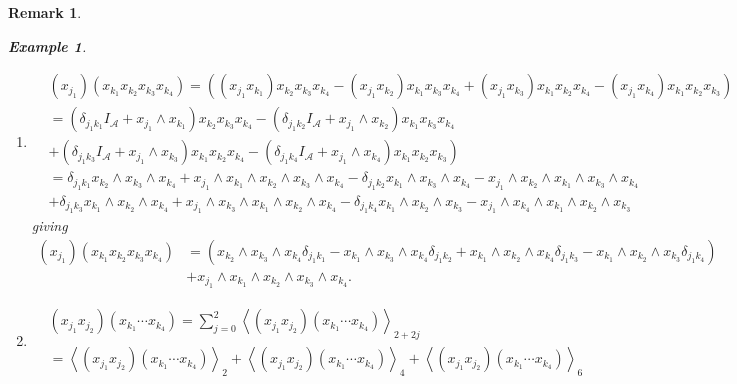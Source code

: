 \documentclass[aps,preprint]{revtex4}%
\newtheorem{example}[theorem]{Example}
\newtheorem{remark}[theorem]{Remark}
\begin{document}
\begin{remark}
\begin{example}
\begin{enumerate}
\item
\begin{align}
&  \left(  x_{j_{1}}\right)  \left(  x_{k_{1}}x_{k_{2}}x_{k_{3}}x_{k_{4}%
}\right)  =\left(  \left(  x_{j_{1}}x_{k_{1}}\right)  x_{k_{2}}x_{k_{3}%
}x_{k_{4}}-\left(  x_{j_{1}}x_{k_{2}}\right)  x_{k_{1}}x_{k_{3}}x_{k_{4}%
}+\left(  x_{j_{1}}x_{k_{3}}\right)  x_{k_{1}}x_{k_{2}}x_{k_{4}}-\left(
x_{j_{1}}x_{k_{4}}\right)  x_{k_{1}}x_{k_{2}}x_{k_{3}}\right) \\
&  =\left(  \delta_{j_{1}k_{1}}I_{\mathcal{A}}+x_{j_{1}}\wedge x_{k_{1}%
}\right)  x_{k_{2}}x_{k_{3}}x_{k_{4}}-\left(  \delta_{j_{1}k_{2}%
}I_{\mathcal{A}}+x_{j_{1}}\wedge x_{k_{2}}\right)  x_{k_{1}}x_{k_{3}}x_{k_{4}%
}\\
&  +\left.  \left(  \delta_{j_{1}k_{3}}I_{\mathcal{A}}+x_{j_{1}}\wedge
x_{k_{3}}\right)  x_{k_{1}}x_{k_{2}}x_{k_{4}}-\left(  \delta_{j_{1}k_{4}%
}I_{\mathcal{A}}+x_{j_{1}}\wedge x_{k_{4}}\right)  x_{k_{1}}x_{k_{2}}x_{k_{3}%
}\right) \\
&  =\delta_{j_{1}k_{1}}x_{k_{2}}\wedge x_{k_{3}}\wedge x_{k_{4}}+x_{j_{1}%
}\wedge x_{k_{1}}\wedge x_{k_{2}}\wedge x_{k_{3}}\wedge x_{k_{4}}%
-\delta_{j_{1}k_{2}}x_{k_{1}}\wedge x_{k_{3}}\wedge x_{k_{4}}-x_{j_{1}}\wedge
x_{k_{2}}\wedge x_{k_{1}}\wedge x_{k_{3}}\wedge x_{k_{4}}\\
&  +\delta_{j_{1}k_{3}}x_{k_{1}}\wedge x_{k_{2}}\wedge x_{k_{4}}+x_{j_{1}%
}\wedge x_{k_{3}}\wedge x_{k_{1}}\wedge x_{k_{2}}\wedge x_{k_{4}}%
-\delta_{j_{1}k_{4}}x_{k_{1}}\wedge x_{k_{2}}\wedge x_{k_{3}}-x_{j_{1}}\wedge
x_{k_{4}}\wedge x_{k_{1}}\wedge x_{k_{2}}\wedge x_{k_{3}}%
\end{align}
giving%
\begin{align}
\left(  x_{j_{1}}\right)  \left(  x_{k_{1}}x_{k_{2}}x_{k_{3}}x_{k_{4}}\right)
&  =\left(  x_{k_{2}}\wedge x_{k_{3}}\wedge x_{k_{4}}\delta_{j_{1}k_{1}%
}-x_{k_{1}}\wedge x_{k_{3}}\wedge x_{k_{4}}\delta_{j_{1}k_{2}}+x_{k_{1}}\wedge
x_{k_{2}}\wedge x_{k_{4}}\delta_{j_{1}k_{3}}-x_{k_{1}}\wedge x_{k_{2}}\wedge
x_{k_{3}}\delta_{j_{1}k_{4}}\right) \\
&  +x_{j_{1}}\wedge x_{k_{1}}\wedge x_{k_{2}}\wedge x_{k_{3}}\wedge x_{k_{4}}.
\end{align}


\item
\begin{align*}
&  \left(  x_{j_{1}}x_{j_{2}}\right)  \left(  x_{k_{1}}\cdots x_{k_{4}%
}\right)  =\sum_{j=0}^{2}\left\langle \left(  x_{j_{1}}x_{j_{2}}\right)
\left(  x_{k_{1}}\cdots x_{k_{4}}\right)  \right\rangle _{2+2j}\\
&  =\left\langle \left(  x_{j_{1}}x_{j_{2}}\right)  \left(  x_{k_{1}}\cdots
x_{k_{4}}\right)  \right\rangle _{2}+\left\langle \left(  x_{j_{1}}x_{j_{2}%
}\right)  \left(  x_{k_{1}}\cdots x_{k_{4}}\right)  \right\rangle
_{4}+\left\langle \left(  x_{j_{1}}x_{j_{2}}\right)  \left(  x_{k_{1}}\cdots
x_{k_{4}}\right)  \right\rangle _{6}%
\end{align*}



\end{enumerate}
\end{example}
\end{remark}
\end{document}
